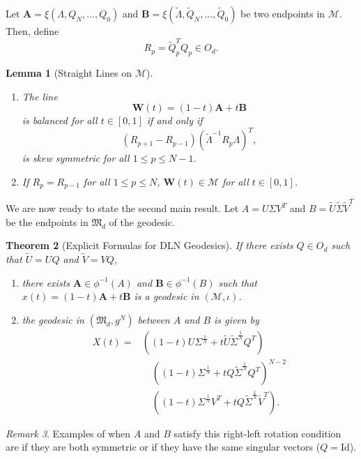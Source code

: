 \documentclass{amsart}
\newtheorem{theorem}{Theorem}[section]
\newtheorem{lemma}[theorem]{Lemma}
\theoremstyle{definition}
\theoremstyle{remark}
\newtheorem{remark}[theorem]{Remark}
\numberwithin{equation}{section}
\begin{document}
Let $\mathbf{A} = \xi(\Lambda, Q_{N}, \ldots, Q_{0})$ and $\mathbf{B} = \xi(\tilde{\Lambda}, \tilde{Q}_N, \ldots, \tilde{Q}_0)$ be two endpoints in $\mathcal{M}$. Then, define \begin{equation}
    R_{p} = \tilde{Q}_{p}^TQ_{p} \in O_d.
\end{equation}
\begin{lemma}[Straight Lines on $\mathcal{M}$]\label{lem:characterization_of_straight_lines}

\begin{enumerate}
    \item The line \begin{equation}
        \mathbf{W}(t) = (1-t) \mathbf{A} + t \mathbf{B}
    \end{equation}
    is balanced for all $t \in [0,1]$ if and only if
    \begin{equation}
        (R_{p+1} - R_{p-1})\left(\tilde{\Lambda}^{-1} R_p \Lambda\right)^T, 
    \end{equation}
    is skew symmetric for all $1 \leq p \leq N-1$.
    \item  If $R_p = R_{p-1}$ for all $1 \leq p \leq N$, $\mathbf{W}(t) \in \mathcal{M}$ for all $t \in [0, 1]$.
\end{enumerate}
    
\end{lemma}

We are now ready to state the second main result. Let $A = U\Sigma V^T$ and $B = \tilde{U}\tilde{\Sigma}\tilde{V}^T$ be the endpoints in $\mathfrak{M}_d$ of the geodesic.
\begin{theorem}[Explicit Formulas for DLN Geodesics]\label{thm:dln_special_case_geodesics}
    If there exists $Q \in O_d$ such that $\tilde{U} = UQ$ and $\tilde{V} = VQ$,
    \begin{enumerate}
        \item there exists $\mathbf{A} \in \phi^{-1}(A)$ and $\mathbf{B} \in \phi^{-1}(B)$ such that $x(t) = (1-t)\mathbf{A} + t\mathbf{B}$ is a geodesic in $(\mathcal{M}, \iota)$.
        \item the geodesic in $(\mathfrak{M}_d, g^N)$ between $A$ and $B$ is given by 
    \begin{equation}
    \begin{split}
        X(t) = &\left((1-t)U\Sigma^\frac{1}{N} +  t\tilde{U}\tilde{\Sigma}^\frac{1}{N}Q^T\right)\\
        &\quad\left((1-t)\Sigma^\frac{1}{N} + tQ\tilde{\Sigma}^\frac{1}{N}Q^T\right)^{N-2}\\
        &\quad\left((1-t)\Sigma^\frac{1}{N}V^T+t Q\tilde{\Sigma}^\frac{1}{N}\tilde{V}^T\right).
    \end{split}
    \end{equation}
    \end{enumerate}
\end{theorem}
\begin{remark}
    Examples of when $A$ and $B$ satisfy this right-left rotation condition are if they are both symmetric or if they have the same singular vectors ($Q = \text{Id}$).
\end{remark}
\end{document}
